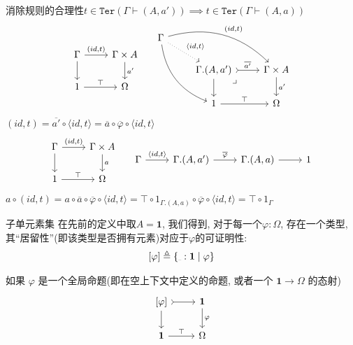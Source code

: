 \documentclass[aspectratio=169,xcolor=dvipsnames]{beamer}
\newcommand\Ter{\mathtt{Ter}}
\newcommand\bfone{\mathbf{1}}
\newcommand{\ul}{{\scalebox{0.4}[0.4]{\_}}}
\begin{document}
\begin{frame}{消除规则的合理性$t\in\Ter(\Gamma\vdash(A,a'))\implies t\in\Ter(\Gamma\vdash(A,a))$}
    \[
  \begin{tabular}[t]{lr}
  \begin{tikzcd}
    \Gamma \arrow[r,"{(id,t)}"] \arrow[d] & \Gamma\times A \arrow[d,"a'"] \\
    1 \arrow[r,"\top"] & \Omega
  \end{tikzcd}
&
  \begin{tikzcd}
\Gamma
\arrow[drr, bend left, "{(id,t)}"]
\arrow[ddr, bend right]
\arrow[dr, dotted, "{\langle id,t\rangle}"] & & \\
& \Gamma.(A,a') \arrow[dr,phantom,"{\lrcorner}",very near start] \arrow[r,tail,"{\overline{a'}}"] \arrow[d]
& \Gamma\times A \arrow[d, "a'"] \\
& 1 \arrow[r, "\top"]
& \Omega
\end{tikzcd}
  \end{tabular} \]
  $(id,t) = \overline{a'}\circ\langle id,t\rangle = \overline{a}\circ\overline{\varphi}\circ\langle id,t\rangle$
  \[
  \begin{tabular}{cc}
    \begin{tikzcd}
    \Gamma \arrow[r,"{(id,t)}"] \arrow[d] & \Gamma\times A \arrow[d,"a"] \\
    1 \arrow[r,"\top"] & \Omega
  \end{tikzcd}
  &
  \begin{tikzcd}
  \Gamma\arrow[r,"{\langle id,t\rangle}"] & \Gamma.(A,a')\arrow[r,"{\overline{\varphi}}"] & \Gamma.(A,a) \arrow[r] & 1
  \end{tikzcd}
\end{tabular}
  \]
  $a\circ(id,t)=a\circ\overline{a}\circ\overline{\varphi}\circ\langle id,t\rangle=\top\circ1_{\Gamma.(A,a)}\circ\overline{\varphi}\circ\langle id,t\rangle = \top\circ1_{\Gamma}$
\end{frame}

\begin{frame}{子单元素集}
  在先前的定义中取$A=\bfone$, 我们得到, 对于每一个$\varphi:\Omega$, 存在一个类型, 其“居留性”(即该类型是否拥有元素)对应于$\varphi$的可证明性:
  \[ [\varphi]\triangleq \{\ul:\bfone\mid\varphi\} \]

  如果 $φ$ 是一个全局命题(即在空上下文中定义的命题, 或者一个 $\bfone → Ω$ 的态射)
  \[
  \begin{tikzcd}
    {[\varphi]} \arrow[r,tail] \arrow[d] & \bfone \arrow[d,"\varphi"] \\
    \bfone \arrow[r,"\top"] & \Omega
  \end{tikzcd}
  \]
\end{frame}
\end{document}
